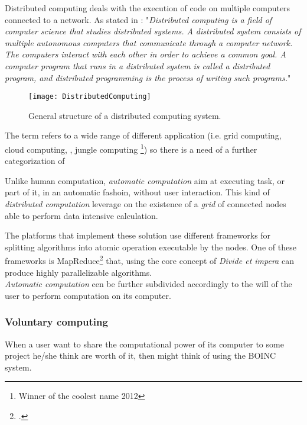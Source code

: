 


Distributed computing deals with the execution of code on multiple computers
connected to a network. As stated in \cite{andrewsfoundations}: "\emph{Distributed
computing is a field of computer science that studies distributed systems. A
distributed system consists of multiple autonomous computers that communicate
through a computer network. The computers interact with each other in order to
achieve a common goal. A computer program that runs in a distributed system is
called a distributed program, and distributed programming is the process of
writing such programs.}"

\begin{figure}[htb]
    \centering
    \texttt{[image: DistributedComputing]}
    \caption{General structure of a distributed computing system.}
    \label{fig:distributed-computing}
\end{figure}

The term refers to a wide range of different application (i.e. grid computing,
cloud computing, , jungle computing
\footnote{Winner of the coolest name 2012}) so there is a need of a further
categorization of 


Unlike human computation, \emph{automatic computation} aim at executing task, or
part of it, in an automatic fashoin, without user interaction. This kind of
\emph{distributed computation} leverage on the existence of a \emph{grid} of
connected nodes able to perform data intensive calculation.

The platforms that implement these solution use different frameworks for splitting
algorithms into atomic operation executable by the nodes. One of these frameworks
is MapReduce\footcite{dean2008mapreduce} that, using the core concept of
\emph{Divide et impera} can produce highly parallelizable algorithms.\\

\emph{Automatic computation} cen be further subdivided accordingly to the will
of the user to perform computation on its computer.

\subsubsection{Voluntary computing}
\label{sec:bg:crowd:auto:voluntary}

When a user want to share the computational power of its computer to some
project he/she think are worth of it, then might think of using the \ac{BOINC}
system.\\

